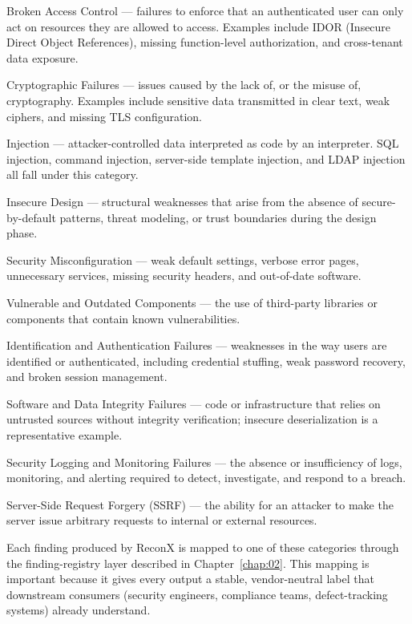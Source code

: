 \begin{description}[style=multiline, leftmargin=2.4cm, labelwidth=2cm]
  \item[A01:2021] Broken Access Control --- failures to enforce that an authenticated user can only act on resources they are allowed to access. Examples include IDOR (Insecure Direct Object References), missing function-level authorization, and cross-tenant data exposure.
  \item[A02:2021] Cryptographic Failures --- issues caused by the lack of, or the misuse of, cryptography. Examples include sensitive data transmitted in clear text, weak ciphers, and missing TLS configuration.
  \item[A03:2021] Injection --- attacker-controlled data interpreted as code by an interpreter. SQL injection, command injection, server-side template injection, and LDAP injection all fall under this category.
  \item[A04:2021] Insecure Design --- structural weaknesses that arise from the absence of secure-by-default patterns, threat modeling, or trust boundaries during the design phase.
  \item[A05:2021] Security Misconfiguration --- weak default settings, verbose error pages, unnecessary services, missing security headers, and out-of-date software.
  \item[A06:2021] Vulnerable and Outdated Components --- the use of third-party libraries or components that contain known vulnerabilities.
  \item[A07:2021] Identification and Authentication Failures --- weaknesses in the way users are identified or authenticated, including credential stuffing, weak password recovery, and broken session management.
  \item[A08:2021] Software and Data Integrity Failures --- code or infrastructure that relies on untrusted sources without integrity verification; insecure deserialization is a representative example.
  \item[A09:2021] Security Logging and Monitoring Failures --- the absence or insufficiency of logs, monitoring, and alerting required to detect, investigate, and respond to a breach.
  \item[A10:2021] Server-Side Request Forgery (SSRF) --- the ability for an attacker to make the server issue arbitrary requests to internal or external resources.
\end{description}

Each finding produced by ReconX is mapped to one of these categories through the finding-registry layer described in Chapter~\ref{chap:02}. This mapping is important because it gives every output a stable, vendor-neutral label that downstream consumers (security engineers, compliance teams, defect-tracking systems) already understand.

